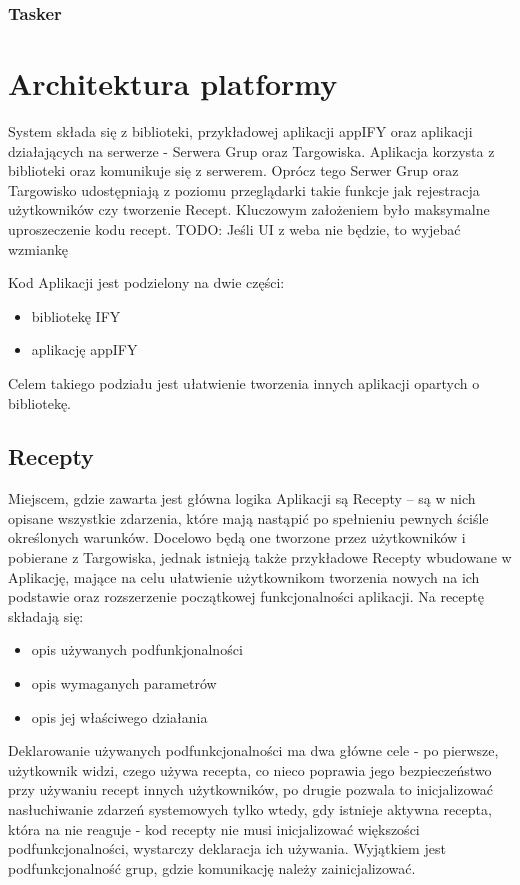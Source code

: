 \documentclass[11pt,a4paper,polish,thesis]{dcsbook}
\begin{document}
\subsection{Tasker}

\chapter{Architektura platformy}
System składa się z biblioteki, przykładowej aplikacji appIFY oraz aplikacji działających na serwerze - Serwera Grup oraz Targowiska.
Aplikacja korzysta z biblioteki oraz komunikuje się z serwerem. Oprócz tego Serwer Grup oraz Targowisko udostępniają z poziomu przeglądarki takie funkcje jak rejestracja użytkowników czy tworzenie Recept. Kluczowym założeniem było maksymalne uproszeczenie kodu recept. 
TODO: Jeśli UI z weba nie będzie, to wyjebać wzmiankę

Kod Aplikacji jest podzielony na dwie części:
\begin{itemize}
\item bibliotekę IFY
\item aplikację appIFY
\end{itemize}
Celem takiego podziału jest ułatwienie tworzenia innych aplikacji opartych o bibliotekę.

\section{Recepty}
Miejscem, gdzie zawarta jest główna logika Aplikacji są Recepty -- są w nich opisane wszystkie zdarzenia, które mają nastąpić po spełnieniu pewnych ściśle określonych warunków. Docelowo będą one tworzone przez użytkowników i pobierane z Targowiska, jednak istnieją także przykładowe Recepty wbudowane w Aplikację, mające na celu ułatwienie użytkownikom tworzenia nowych na ich podstawie oraz rozszerzenie początkowej funkcjonalności aplikacji. 
Na receptę składają się:
\begin{itemize}
\item  opis używanych podfunkjonalności
\item  opis wymaganych parametrów
\item  opis jej właściwego działania
\end{itemize}
Deklarowanie używanych podfunkcjonalności ma dwa główne cele - po pierwsze, użytkownik widzi, czego używa recepta, co nieco poprawia jego bezpieczeństwo przy używaniu recept innych użytkowników, po drugie pozwala to inicjalizować nasłuchiwanie zdarzeń systemowych tylko wtedy, gdy istnieje aktywna recepta, która na nie reaguje - kod recepty nie musi inicjalizować większości podfunkcjonalności, wystarczy deklaracja ich używania. Wyjątkiem jest podfunkcjonalność grup, gdzie komunikację należy zainicjalizować.
\end{document}
